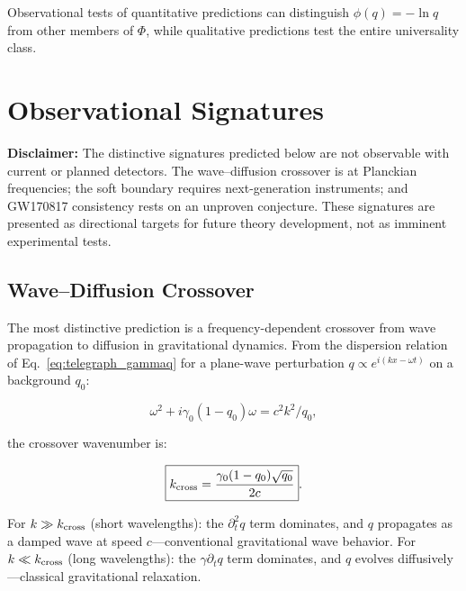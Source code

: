 \documentclass[aps,prd,twocolumn,showpacs,superscriptaddress,preprintnumbers]{revtex4-2}
\begin{document}
Observational tests of quantitative predictions can distinguish $\phi(q)=-\ln q$ from other members of $\Phi$, while qualitative predictions test the entire universality class.

\section{Observational Signatures}
\label{sec:predictions}

\textbf{Disclaimer:} The distinctive signatures predicted below are not observable with current or planned detectors. The wave--diffusion crossover is at Planckian frequencies; the soft boundary requires next-generation instruments; and GW170817 consistency rests on an unproven conjecture. These signatures are presented as directional targets for future theory development, not as imminent experimental tests.

\subsection{Wave--Diffusion Crossover}

The most distinctive prediction is a frequency-dependent crossover from wave propagation to diffusion in gravitational dynamics.
From the dispersion relation of Eq.~\eqref{eq:telegraph_gammaq} for a plane-wave perturbation $q\propto e^{i(kx-\omega t)}$ on a background $q_0$:

\begin{equation}
\omega^2 + i\gamma_0(1-q_0)\omega = c^2 k^2/q_0,
\label{eq:dispersion}
\end{equation}

the crossover wavenumber is:

\begin{equation}
\boxed{k_{\rm cross} = \frac{\gamma_0(1-q_0)\sqrt{q_0}}{2c}}.
\label{eq:kcross}
\end{equation}

For $k\gg k_{\rm cross}$ (short wavelengths): the $\partial_t^2 q$ term dominates, and $q$ propagates as a damped wave at speed $c$---conventional gravitational wave behavior.
For $k\ll k_{\rm cross}$ (long wavelengths): the $\gamma\partial_t q$ term dominates, and $q$ evolves diffusively---classical gravitational relaxation.
\end{document}
